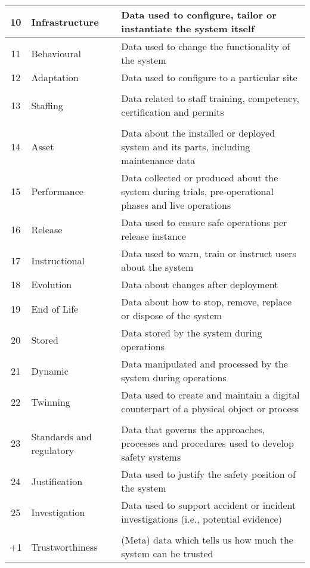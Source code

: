 \begin{longtable}{|C{}|L{}|L{}|}
  {10} & {Infrastructure} & {Data used to configure, tailor or instantiate the system itself}\\\hline
  {11} & {Behavioural} & {Data used to change the functionality of the system}\\\hline
  {12} & {Adaptation} & {Data used to configure to a particular site}\\\hline
  \\\hline
  {13} & {Staffing} & {Data related to staff training, competency, certification and permits}\\\hline
  \\\hline
  {14} & {Asset} & {Data about the installed or deployed system and its parts, including maintenance data}\\\hline
  {15} & {Performance} & {Data collected or produced about the system during trials, pre-operational phases and live operations}\\\hline
  {16} & {Release} & {Data used to ensure safe operations per release instance}\\\hline
  {17} & {Instructional} & {Data used to warn, train or instruct users about the system}\\\hline
  {18} & {Evolution} & {Data about changes after deployment}\\\hline
  {19} & {End of Life} & {Data about how to stop, remove, replace or dispose of the system}\\\hline
  {20} & {Stored} & {Data stored by the system during operations}\\\hline
  {21} & {Dynamic} & {Data manipulated and processed by the system during operations}\\\hline
  {22} & {Twinning} & {Data used to create and maintain a digital counterpart of a physical object or process}\\\hline
%
  \\\hline
  {23} & {Standards and regulatory} & {Data that governs the approaches,  processes and procedures used to develop safety systems}\\\hline
  {24} & {Justification} & {Data used to justify the safety position of the system}\\\hline
  {25} & {Investigation} & {Data used to support accident or incident investigations (i.e., potential evidence)}\\\hline
  \\\hline
  {+1} & {Trustworthiness} & {(Meta) data which tells us how much the system can be trusted}\\\hline
\end{longtable}

